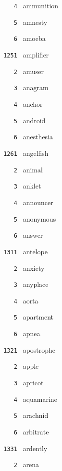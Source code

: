 \documentclass[11pt]{article}
\begin{document}
\begin{multicols}{6}
\noindent \texttt{ \ \ \ 4 } ammunition  \par
\noindent \texttt{ \ \ \ 5 } amnesty  \par
\noindent \texttt{ \ \ \ 6 } amoeba  \par
\vspace{3mm}
\noindent \texttt{ 1251 } amplifier  \par
\noindent \texttt{ \ \ \ 2 } amuser  \par
\noindent \texttt{ \ \ \ 3 } anagram  \par
\noindent \texttt{ \ \ \ 4 } anchor  \par
\noindent \texttt{ \ \ \ 5 } android  \par
\noindent \texttt{ \ \ \ 6 } anesthesia  \par
\vspace{3mm}
\noindent \texttt{ 1261 } angelfish  \par
\noindent \texttt{ \ \ \ 2 } animal  \par
\noindent \texttt{ \ \ \ 3 } anklet  \par
\noindent \texttt{ \ \ \ 4 } announcer  \par
\noindent \texttt{ \ \ \ 5 } anonymous  \par
\noindent \texttt{ \ \ \ 6 } answer  \par
\noindent \texttt{ 1311 } antelope  \par
\noindent \texttt{ \ \ \ 2 } anxiety  \par
\noindent \texttt{ \ \ \ 3 } anyplace  \par
\noindent \texttt{ \ \ \ 4 } aorta  \par
\noindent \texttt{ \ \ \ 5 } apartment  \par
\noindent \texttt{ \ \ \ 6 } apnea  \par
\vspace{3mm}
\noindent \texttt{ 1321 } apostrophe  \par
\noindent \texttt{ \ \ \ 2 } apple  \par
\noindent \texttt{ \ \ \ 3 } apricot  \par
\noindent \texttt{ \ \ \ 4 } aquamarine  \par
\noindent \texttt{ \ \ \ 5 } arachnid  \par
\noindent \texttt{ \ \ \ 6 } arbitrate  \par
\vspace{3mm}
\noindent \texttt{ 1331 } ardently  \par
\noindent \texttt{ \ \ \ 2 } arena  \par

\end{multicols}
\end{document}
